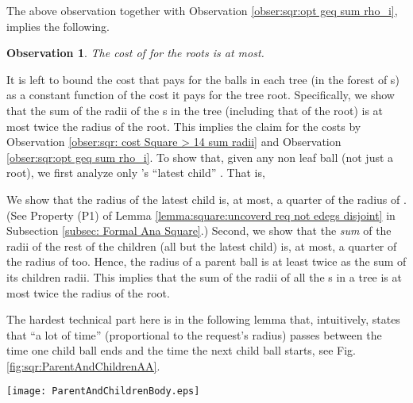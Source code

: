\documentclass[11pt]{article}
\newtheorem{observation}[theorem]{Observation}
\begin{document}
\noindent The above observation together with Observation
\ref{obser:sqr:opt geq sum rho_i}, implies the following.

\vspace{0.2cm}
\begin{observation}
\label{obs:roots-cost}
The cost of  for the roots is  at most.
\end{observation}
\vspace{0.2cm}

It is left to bound the cost that  pays for the balls in each tree (in the forest of s) as a constant function of the cost it pays for the tree root.
Specifically, we show that the sum of the radii of the s in the tree (including that of the root) is at most twice the radius of the root.
This implies the claim for the costs by Observation \ref{obser:sqr: cost Square > 14 sum radii} and Observation \ref{obser:sqr:opt geq sum rho_i}.
To show that, given any non leaf ball  (not just a root), we first analyze
only 's ``latest child'' .
That is,

We show
that the radius of the latest child is, at most, a quarter of the radius of .
(See Property (P1) of Lemma \ref{lemma:square:uncoverd req not edegs disjoint} in Subsection \ref{subsec: Formal Ana Square}.)
Second, we show that the {\em sum} of the radii of the rest of the children (all but the latest child) is, at most, a quarter of the radius of  too.
Hence, the radius of a parent ball is at least twice as the sum of its children radii.
This implies that the sum of the radii of all the s in a tree is at most twice the radius of the root.



The hardest technical part here is in the following lemma that,
intuitively, states that ``a lot of time'' (proportional to the request's radius) passes between the time one child ball ends and the time the next child ball starts, see Fig. \ref{fig:sqr:ParentAndChildrenAA}.



\begin{figure*}
\begin{center}
\texttt{[image: ParentAndChildrenBody.eps]}
\end{center}
\caption{\sf Geometric look on a parent  (note that a  is a triangle) and its children  and .
\label{fig:sqr:ParentAndChildrenAA}
}
\end{figure*}
\end{document}
